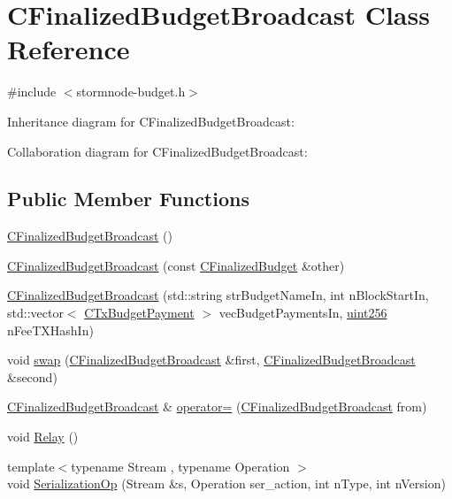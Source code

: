 \hypertarget{class_c_finalized_budget_broadcast}{}\section{C\+Finalized\+Budget\+Broadcast Class Reference}
\label{class_c_finalized_budget_broadcast}


{\ttfamily \#include $<$stormnode-\/budget.\+h$>$}



Inheritance diagram for C\+Finalized\+Budget\+Broadcast\+:


Collaboration diagram for C\+Finalized\+Budget\+Broadcast\+:
\subsection*{Public Member Functions}
\begin{DoxyCompactItemize}
\item 
\hyperlink{class_c_finalized_budget_broadcast_a3d89b0b5358a37cff1c1b549c910681f}{C\+Finalized\+Budget\+Broadcast} ()
\item 
\hyperlink{class_c_finalized_budget_broadcast_a0fc9903afc9a1ccfc7008f0bb95ba26e}{C\+Finalized\+Budget\+Broadcast} (const \hyperlink{class_c_finalized_budget}{C\+Finalized\+Budget} \&other)
\item 
\hyperlink{class_c_finalized_budget_broadcast_a800780793836750ec3c848e87fb397a7}{C\+Finalized\+Budget\+Broadcast} (std\+::string str\+Budget\+Name\+In, int n\+Block\+Start\+In, std\+::vector$<$ \hyperlink{class_c_tx_budget_payment}{C\+Tx\+Budget\+Payment} $>$ vec\+Budget\+Payments\+In, \hyperlink{classuint256}{uint256} n\+Fee\+T\+X\+Hash\+In)
\item 
void \hyperlink{class_c_finalized_budget_broadcast_ac9e99f471d82a9c2d76137a758740315}{swap} (\hyperlink{class_c_finalized_budget_broadcast}{C\+Finalized\+Budget\+Broadcast} \&first, \hyperlink{class_c_finalized_budget_broadcast}{C\+Finalized\+Budget\+Broadcast} \&second)
\item 
\hyperlink{class_c_finalized_budget_broadcast}{C\+Finalized\+Budget\+Broadcast} \& \hyperlink{class_c_finalized_budget_broadcast_afccbdda2d00c695c63802db0fda2d489}{operator=} (\hyperlink{class_c_finalized_budget_broadcast}{C\+Finalized\+Budget\+Broadcast} from)
\item 
void \hyperlink{class_c_finalized_budget_broadcast_abb4cfac3327e7cb912b368054d23fc9c}{Relay} ()
\item 
{\footnotesize template$<$typename Stream , typename Operation $>$ }\\void \hyperlink{class_c_finalized_budget_broadcast_a2c9bac4bb653dbae4c3861fd12380dcd}{Serialization\+Op} (Stream \&s, Operation ser\+\_\+action, int n\+Type, int n\+Version)
\end{DoxyCompactItemize}
